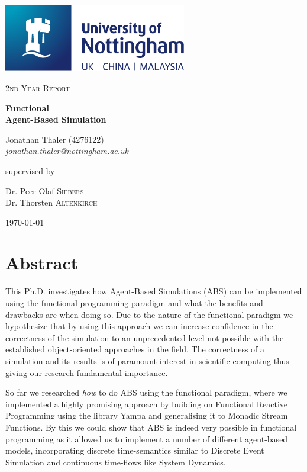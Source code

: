 \documentclass[oneside]{book}
\begin{document}
\begin{titlepage}
	\centering
	\includegraphics[width=0.60\textwidth]{./logo/UoN_Primary_Logo_RGB.png}\par\vspace{1cm}
	{\scshape\Large 2nd Year Report\par}
	\vspace{1.5cm}
	{\huge\bfseries Functional \\ Agent-Based Simulation\par}
	\vspace{2cm}
	{\Large Jonathan Thaler (4276122) \\ \itshape jonathan.thaler@nottingham.ac.uk \par}
	\vfill
	supervised by\par
	Dr. Peer-Olaf \textsc{Siebers} \\
	Dr. Thorsten \textsc{Altenkirch}

	\vfill

	{\large \today\par}
\end{titlepage}

\cleardoublepage

\section*{Abstract}
This Ph.D. investigates how Agent-Based Simulations (ABS) can be implemented using the functional programming paradigm and what the benefits and drawbacks are when doing so. Due to the nature of the functional paradigm we hypothesize that by using this approach we can increase confidence in the correctness of the simulation to an unprecedented level not possible with the established object-oriented approaches in the field. The correctness of a simulation and its results is of paramount interest in scientific computing thus giving our research fundamental importance.

So far we researched \textit{how} to do ABS using the functional paradigm, where we implemented a highly promising approach by building on Functional Reactive Programming using the library Yampa and generalising it to Monadic Stream Functions. By this we could show that ABS is indeed very possible in functional programming as it allowed us to implement a number of different agent-based models, incorporating discrete time-semantics similar to Discrete Event Simulation and continuous time-flows like System Dynamics.
\end{document}
